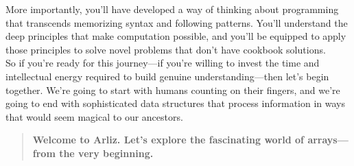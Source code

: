 More importantly, you'll have developed a way of thinking about programming that transcends memorizing syntax and following patterns. You'll understand the deep principles that make computation possible, and you'll be equipped to apply those principles to solve novel problems that don't have cookbook solutions.\\

So if you're ready for this journey—if you're willing to invest the time and intellectual energy required to build genuine understanding—then let's begin together. We're going to start with humans counting on their fingers, and we're going to end with sophisticated data structures that process information in ways that would seem magical to our ancestors.\\

\begin{quote}
	\textbf{Welcome to Arliz. Let's explore the fascinating world of arrays—from the very beginning.}
\end{quote}